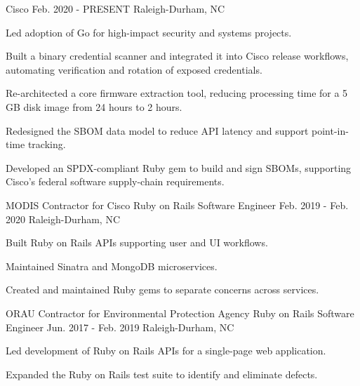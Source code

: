 

\begin{cventries}

\cventry
{Cisco} %
{\currentTitle} %
{Feb. 2020 - PRESENT} %
{Raleigh-Durham, NC} %
{ %
\begin{cvitems}
\item {Led adoption of Go for high-impact security and systems projects.}
\item {Built a binary credential scanner and integrated it into Cisco release workflows, automating verification and rotation of exposed credentials.}
\item {Re-architected a core firmware extraction tool, reducing processing time for a 5 GB disk image from 24 hours to 2 hours.}
\item {Redesigned the SBOM data model to reduce API latency and support point-in-time tracking.}
\item {Developed an SPDX-compliant Ruby gem to build and sign SBOMs, supporting Cisco's federal software supply-chain requirements.}
\end{cvitems}
}

\cventry
{MODIS Contractor for Cisco} %
{Ruby on Rails Software Engineer} %
{Feb. 2019 - Feb. 2020} %
{Raleigh-Durham, NC} %
{ %
\begin{cvitems}
\item {Built Ruby on Rails APIs supporting user and UI workflows.}
\item {Maintained Sinatra and MongoDB microservices.}
\item {Created and maintained Ruby gems to separate concerns across services.}
\end{cvitems}
}

\cventry
{ORAU Contractor for Environmental Protection Agency} %
{Ruby on Rails Software Engineer} %
{Jun. 2017 - Feb. 2019} %
{Raleigh-Durham, NC} %
{ %
\begin{cvitems}
\item {Led development of Ruby on Rails APIs for a single-page web application.}
\item {Expanded the Ruby on Rails test suite to identify and eliminate defects.}
\end{cvitems}
}
\end{cventries}
